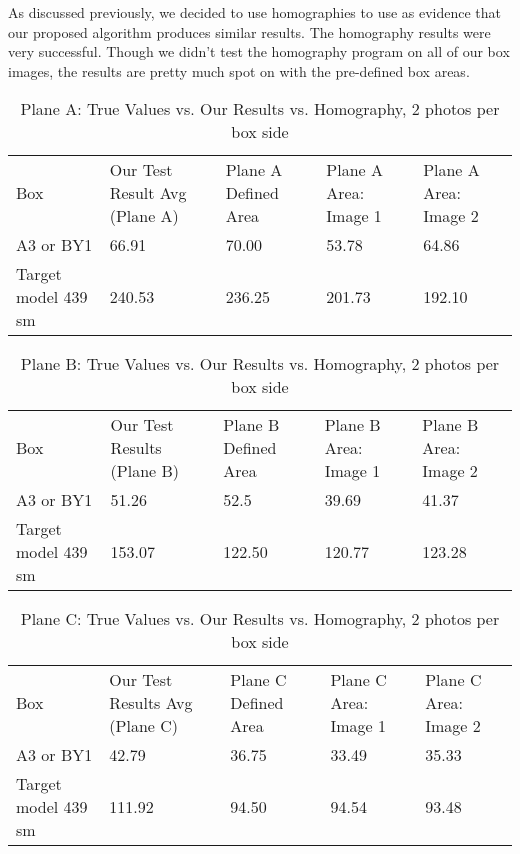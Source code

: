 \documentclass[11pt, twoside, reqno]{book}
\begin{document}
As discussed previously, we decided to use homographies to use as evidence that our proposed algorithm produces similar results. The homography results were very successful. Though we didn't test the homography program on all of our box images, the results are pretty much spot on with the pre-defined box areas.  \\
\FloatBarrier
\begin{table}[]
	\centering
	\caption{Plane A: True Values vs. Our Results vs. Homography, 2 photos per box side}
	\tiny
	\label{my-label}
	\begin{tabular}{lllll}
		Box                 & Our Test Result Avg (Plane A) & Plane A Defined Area & Plane A Area: Image 1 & Plane A Area: Image 2 \\
		A3 or BY1           & 66.91                         & 70.00                & 53.78                & 64.86                \\
		Target model 439 sm & 240.53                        & 236.25               & 201.73               & 192.10              
	\end{tabular}
\end{table}

\FloatBarrier
\begin{table}[]
	\centering
	\caption{Plane B: True Values vs. Our Results vs. Homography, 2 photos per box side}
	\tiny
	\label{my-label}
	\begin{tabular}{lllll}
		Box                 & Our Test Results (Plane B) & Plane B Defined Area & Plane B Area: Image 1 & Plane B Area: Image 2 \\
		A3 or BY1           & 51.26                      & 52.5                 & 39.69                & 41.37                \\
		Target model 439 sm & 153.07                     & 122.50               & 120.77               & 123.28              
	\end{tabular}
\end{table}
\FloatBarrier
\begin{table}[]
	\centering
	\tiny
	\caption{Plane C: True Values vs. Our Results vs. Homography, 2 photos per box side}
	\label{my-label}
	\begin{tabular}{lllll}
		Box                 & Our Test Results Avg (Plane C) & Plane C Defined Area & Plane C Area: Image 1 & Plane C Area: Image 2 \\
		A3 or BY1           & 42.79                          & 36.75                & 33.49                & 35.33                \\
		Target model 439 sm & 111.92                         & 94.50                & 94.54                & 93.48               
	\end{tabular}
\end{table}
\FloatBarrier
\end{document}
